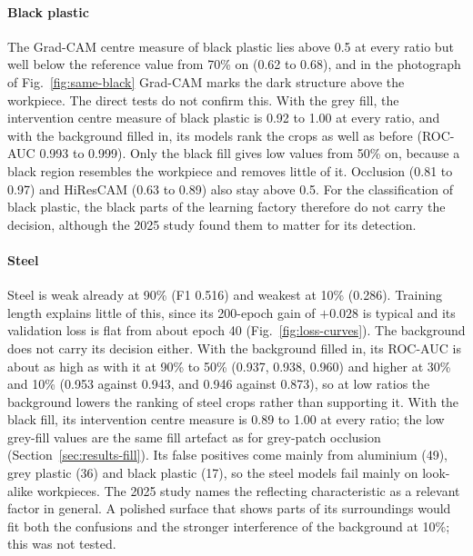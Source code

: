 \paragraph{Black plastic}
The Grad-CAM centre measure of black plastic lies above 0.5 at every ratio but well below
the reference value from 70\% on (0.62 to 0.68), and in the photograph of
Fig.~\ref{fig:same-black} Grad-CAM marks the dark structure above the workpiece. The
direct tests do not confirm this. With the grey fill, the intervention centre measure of
black plastic is 0.92 to 1.00 at every ratio, and with the background filled in, its
models rank the crops as well as before (ROC-AUC 0.993 to 0.999). Only the black fill
gives low values from 50\% on, because a black region resembles the workpiece and
removes little of it. Occlusion (0.81 to 0.97) and HiResCAM (0.63 to 0.89) also stay
above 0.5. For the classification of black plastic, the black parts of the learning
factory therefore do not carry the decision, although the 2025 study found them to
matter for its detection.

\paragraph{Steel}
Steel is weak already at 90\% (F1 0.516) and weakest at 10\% (0.286). Training length
explains little of this, since its 200-epoch gain of $+0.028$ is typical and its
validation loss is flat from about epoch 40 (Fig.~\ref{fig:loss-curves}). The background
does not carry its decision either. With the background filled in, its ROC-AUC is about
as high as with it at 90\% to 50\% (0.937, 0.938, 0.960) and higher at 30\% and 10\%
(0.953 against 0.943, and 0.946 against 0.873), so at low ratios the background lowers
the ranking of steel crops rather than supporting it. With the black fill, its
intervention centre measure is 0.89 to 1.00 at every ratio; the low grey-fill values are
the same fill artefact as for grey-patch occlusion (Section~\ref{sec:results-fill}).
Its false positives come mainly from aluminium (49), grey plastic (36) and black
plastic (17), so the steel models fail mainly on look-alike workpieces. The 2025 study
names the reflecting characteristic as a relevant factor in general. A polished surface
that shows parts of its surroundings would fit both the confusions and the stronger
interference of the background at 10\%; this was not tested.

